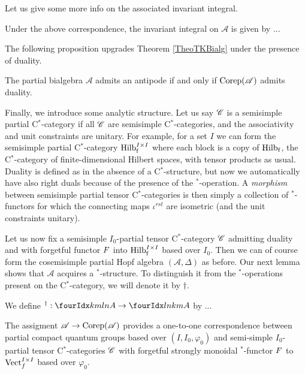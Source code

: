 Let us give some more info on the associated invariant integral.

\begin{Lem} Under the above correspondence, the invariant integral on $\mathscr{A}$ is given by ...

\end{Lem}

The following proposition upgrades Theorem \ref{TheoTKBialg} under the presence of duality.

\begin{Prop} The partial bialgebra $\mathscr{A}$ admits an antipode if and only if $\mathrm{Corep}(\mathscr{A})$ admits duality.
\end{Prop} 

Finally, we introduce some analytic structure. Let us say $\mathscr{C}$ is a semisimple partial C$^*$-category if all $\mathscr{C}$ are semisimple C$^*$-categories, and the associativity and unit constraints are unitary. For example, for a set $I$ we can form the semisimple partial C$^*$-category $\mathrm{Hilb}_{\operatorname{\mathrm{f}}}^{I\times I}$ where each block is a copy of $\mathrm{Hilb}_{\operatorname{\mathrm{f}}}$, the C$^*$-category of finite-dimensional Hilbert spaces, with tensor products as usual. Duality is defined as in the absence of a C$^*$-structure, but now we automatically have also right duals because of the presence of the $^*$-operation. A \emph{morphism} between semisimple partial tensor C$^*$-categories is then simply a collection of $^*$-functors for which the connecting maps $\iota^{rst}$ are isometric (and the unit constraints unitary). 

Let us now fix a semisimple $I_0$-partial tensor C$^*$-category $\mathscr{C}$ admitting duality and with forgetful functor $F$ into $\mathrm{Hilb}_{\operatorname{\mathrm{f}}}^{I\times I}$ based over $I_0$. Then we can of course form the cosemisimple partial Hopf algebra $(\mathscr{A},\Delta)$ as before. Our next lemma shows that $\mathscr{A}$ acquires a $^*$-structure. To distinguish it from the $^*$-operations present on the C$^*$-category, we will denote it by $\dagger$.

\begin{Def} We define $^\dag: \Gr{A}{k}{l}{m}{n}\rightarrow \Gr{A}{l}{k}{n}{m}$ by ...

\end{Def}

\begin{Theorem} \label{TheoTKPCQG} The assigment $\mathscr{A}\rightarrow \mathrm{Corep}(\mathscr{A})$ provides a one-to-one correspondence between partial compact quantum groups based over $(I,I_0,\varphi_0)$ %
and semi-simple $I_0$-partial tensor C$^*$-categories $\mathscr{C}$ with forgetful strongly monoidal $^*$-functor $F$ to $\mathrm{Vect}_f^{I\times I}$ based over $\varphi_0$. %
\end{Theorem} 

